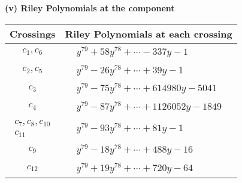 \documentclass[1p]{elsarticle_modified}
\theoremstyle{definition}
\begin{document}
\newpage\renewcommand{\arraystretch}{1}
\flushleft \textbf{(v) Riley Polynomials at the component}\newline \\
\begin{tabular}{m{50pt}|m{274pt}}
Crossings & \hspace{64pt}Riley Polynomials at each crossing \\
\hline $$\begin{aligned}c_{1},c_{6}\end{aligned}$$&$\begin{aligned}
&y^{79}+58 y^{78}+\cdots-337 y-1
\end{aligned}$\\
\hline $$\begin{aligned}c_{2},c_{5}\end{aligned}$$&$\begin{aligned}
&y^{79}-26 y^{78}+\cdots+39 y-1
\end{aligned}$\\
\hline $$\begin{aligned}c_{3}\end{aligned}$$&$\begin{aligned}
&y^{79}-75 y^{78}+\cdots+614980 y-5041
\end{aligned}$\\
\hline $$\begin{aligned}c_{4}\end{aligned}$$&$\begin{aligned}
&y^{79}-87 y^{78}+\cdots+1126052 y-1849
\end{aligned}$\\
\hline $$\begin{aligned}c_{7},c_{8},c_{10}\\c_{11}\end{aligned}$$&$\begin{aligned}
&y^{79}-93 y^{78}+\cdots+81 y-1
\end{aligned}$\\
\hline $$\begin{aligned}c_{9}\end{aligned}$$&$\begin{aligned}
&y^{79}-18 y^{78}+\cdots+488 y-16
\end{aligned}$\\
\hline $$\begin{aligned}c_{12}\end{aligned}$$&$\begin{aligned}
&y^{79}+19 y^{78}+\cdots+720 y-64
\end{aligned}$\\
\hline
\end{tabular}\\~\\
\end{document}
